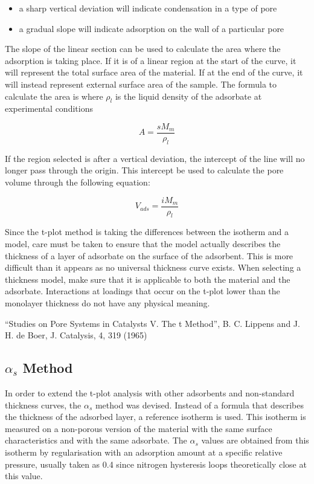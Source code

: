 \begin{itemize}

	\item a sharp vertical deviation will indicate condensation
	      in a type of pore
	\item a gradual slope will indicate adsorption on the
	      wall of a particular pore

\end{itemize}

The slope of the linear section can be used to calculate the area where
the adsorption is taking place. If it is of a linear region at the start
of the curve, it will represent the total surface area of the material.
If at the end of the curve, it will instead represent external surface
area of the sample. The formula to calculate the area is
where \(\rho_{l}\) is the liquid density of the adsorbate at experimental
conditions

\begin{equation}
	A = \frac{s M_m}{\rho_{l}}
\end{equation}


If the region selected is after a vertical deviation, the intercept of the line
will no longer pass through the origin. This intercept be used to calculate the
pore volume through the following equation:

\begin{equation}
	V_{ads} = \frac{i M_m}{\rho_{l}}
\end{equation}


Since the t-plot method is taking the differences between the
isotherm and a model, care must be taken to ensure that the model
actually describes the thickness of a layer of adsorbate on the
surface of the adsorbent. This is more difficult than it
appears as no universal thickness curve exists.
When selecting a thickness model, make sure that it is applicable
to both the material and the adsorbate.
Interactions at loadings that occur on the t-plot lower than the monolayer
thickness do not have any physical meaning.


“Studies on Pore Systems in Catalysts V. The t Method”,
B. C. Lippens and J. H. de Boer, J. Catalysis, 4, 319 (1965)

\subsection{\(\alpha_s\) Method}

In order to extend the t-plot analysis with other adsorbents and non-standard
thickness curves, the \(\alpha_s\) method was devised. Instead of
a formula that describes the thickness of the adsorbed layer, a reference
isotherm is used. This isotherm is measured on a non-porous version of the
material with the same surface characteristics and with the same adsorbate.
The \(\alpha_s\) values are obtained from this isotherm by regularisation with
an adsorption amount at a specific relative pressure, usually taken as 0.4 since
nitrogen hysteresis loops theoretically close at this value.

